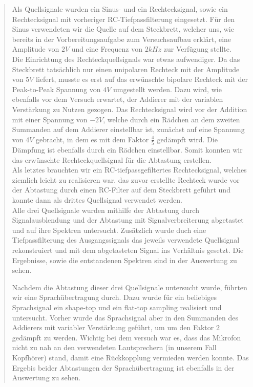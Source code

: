 \begin{quote}
         Als Quellsignale wurden ein Sinus- und ein Rechtecksignal, sowie ein
         Rechtecksignal mit vorheriger RC-Tiefpassfilterung eingesetzt. Für den
         Sinus verwendeten wir die Quelle auf dem Steckbrett, welcher uns, wie
         bereits in der Vorbereitungsaufgabe zum Versuchsaufbau erklärt, eine
         Amplitude von $2V$ und eine Frequenz von $2 kHz$ zur Verfügung
         stellte.\\
         Die Einrichtung des Rechteckquellsignals war etwas aufwendiger. Da das
         Steckbrett tatsächlich nur einen unipolaren Rechteck mit der Amplitude
         von $5V$ liefert, musste es erst auf das erwünschte bipolare Rechteck
         mit der Peak-to-Peak Spannung von $4V$ umgestellt werden. Dazu wird,
         wie ebenfalls vor dem Versuch erwartet, der Addierer mit der variablen
         Verstärkung zu Nutzen gezogen. Das Rechtecksignal wird vor der Addition
         mit einer Spannung von $-2V$, welche durch ein Rädchen an dem
         zweiten Summanden auf dem Addierer einstellbar ist, zunächst auf eine
         Spannung von $4V$ gebracht, in dem es mit dem Faktor $\frac{4}{5}$ gedämpft wird. 
         Die Dämpfung ist ebenfalls durch ein Rädchen einstellbar. Somit konnten
         wir das erwünschte Rechteckquellsignal für die Abtastung erstellen.\\
         Als letztes brauchten wir ein RC-tiefpassgefiltertes Rechtecksignal,
         welches ziemlich leicht zu realisieren war. das zuvor erstellte
         Rechteck wurde vor der Abtastung durch einen RC-Filter auf dem
         Steckbrett geführt und konnte dann als drittes Quellsignal verwendet
         werden.\\
         
         Alle drei Quellsignale wurden mithilfe der Abtastung durch Signalausblendung und
         der Abtastung mit Signalverbreiterung abgetastet und auf ihre Spektren
         untersucht. Zusätzlich wurde duch eine Tiefpassfilterung des
         Ausgangssignals das jeweils verwendete Quellsignal rekonstruiert und
         mit dem abgetasteten Signal ins Verhältnis gesetzt. Die Ergebnisse,
         sowie die entstandenen Spektren sind in der Auswertung zu sehen.
         
         \vspace{1em}
         
         Nachdem die Abtastung dieser drei Quellsignale untersucht wurde,
         führten wir eine Sprachübertragung durch. Dazu wurde für ein beliebiges
         Sprachsignal ein shape-top und ein flat-top sampling realisiert und
         untersucht. Vorher wurde das Sprachsignal aber in den Summanden des
         Addierers mit variabler Verstärkung geführt, um um den Faktor $2$
         gedämpft zu werden. Wichtig bei dem versuch war es, dass das Mikrofon
         nicht zu nah an den verwendeten Lautsprechern (in unserem Fall
         Kopfhörer) stand, damit eine Rückkopplung vermieden werden konnte.
         Das Ergebis beider Abtastungen der Sprachübertragung ist ebenfalls in
         der Auswertung zu sehen.
         
         
   	\end{quote}%

